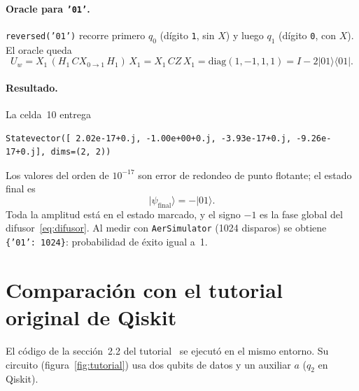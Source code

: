 \documentclass[11pt,a4paper]{article}
\providecommand{\ket}{}\renewcommand{\ket}[1]{\lvert #1\rangle}
\newcommand{\ketbra}[2]{\lvert #1\rangle\!\langle #2\rvert}
\begin{document}
\paragraph{Oracle para \texttt{'01'}.} \texttt{reversed('01')} recorre primero $q_0$ (dígito \texttt{1}, sin $X$)
y luego $q_1$ (dígito \texttt{0}, con $X$). El oracle queda
\begin{equation}
U_w = X_1\,(H_1\,CX_{0\to1}\,H_1)\,X_1 = X_1\,CZ\,X_1 = \mathrm{diag}(1,-1,1,1) = I-2\ketbra{01}{01}.
\end{equation}

\paragraph{Resultado.} La celda~10 entrega
\begin{lstlisting}
Statevector([ 2.02e-17+0.j, -1.00e+00+0.j, -3.93e-17+0.j, -9.26e-17+0.j], dims=(2, 2))
\end{lstlisting}
Los valores del orden de $10^{-17}$ son error de redondeo de punto flotante; el estado final es
\begin{equation}
\ket{\psi_{\text{final}}} = -\ket{01}.
\end{equation}
Toda la amplitud está en el estado marcado, y el signo $-1$ es la fase global del difusor~\eqref{eq:difusor}.
Al medir con \texttt{AerSimulator} (1024 disparos) se obtiene \texttt{\{'01': 1024\}}: probabilidad de éxito igual a~1.

\section{Comparación con el tutorial original de Qiskit}

El código de la sección~2.2 del tutorial~\cite{ibm} se ejecutó en el mismo entorno. Su circuito
(figura~\ref{fig:tutorial}) usa dos qubits de datos y un auxiliar $a$ ($q_2$ en Qiskit).
\end{document}
